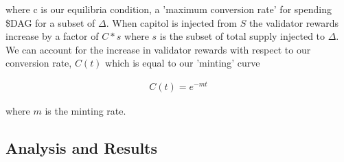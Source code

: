 \documentclass{article}
\begin{document}
where c is our equilibria condition, a 'maximum conversion rate' for spending \$DAG for a subset of $\Delta$. When capitol is injected from $S$ the validator rewards increase by a factor of $C*s$ where $s$ is the subset of total supply injected to $\Delta$. We can account for the increase in validator rewards with respect to our conversion rate, $C(t)$ which is equal to our 'minting' curve

\begin{equation*} \label{eq1}
\begin{split}
C(t) = e^{-mt}
\end{split}
\end{equation*}

where $m$ is the minting rate.
\subsection{Analysis and Results}



\end{document}
